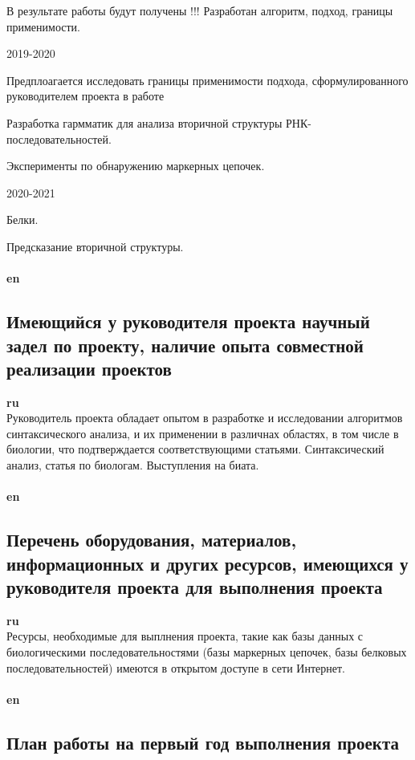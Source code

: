 \documentclass[12pt]{article}  %
\theoremstyle{remark}
\begin{document}
В результате работы будут получены !!! Разработан алгоритм, подход, границы применимости.

2019-2020

Предплоагается исследовать границы применимости подхода, сформулированного руководителем проекта в работе

Разработка гармматик для анализа вторичной структуры РНК-последовательностей.

Эксперименты по обнаружению маркерных цепочек.


2020-2021

Белки.

Предсказание вторичной структуры.
\\
\\
\textbf{en}\\


\subsection{Имеющийся у руководителя проекта научный задел по проекту, наличие опыта совместной реализации проектов}

\textbf{ru}\\
Руководитель проекта обладает опытом в разработке и исследовании алгоритмов синтаксического анализа, и их применении в различнах областях, в том числе в биологии, что подтверждается соответствующими статьями.
Синтаксический анализ, статья по биологам. Выступления на биата.
\\
\\
\textbf{en}\\


\subsection{Перечень оборудования, материалов, информационных и других ресурсов, имеющихся у руководителя проекта для выполнения проекта }
\textbf{ru}\\
Ресурсы, необходимые для выплнения проекта, такие как базы данных с биологическими последовательностями (базы маркерных цепочек, базы белковых последовательностей) имеются в открытом доступе в сети Интернет.
\\
\\
\textbf{en}\\


\subsection{План работы на первый год выполнения проекта}
\end{document}
